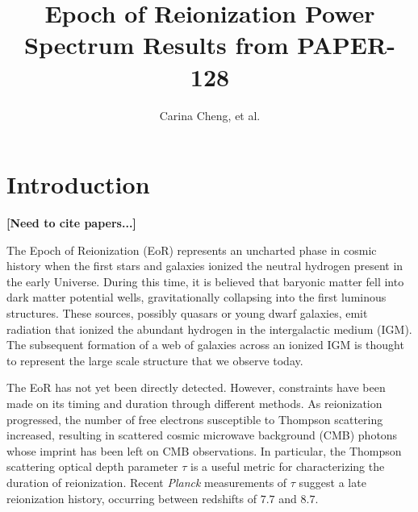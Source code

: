\documentclass[preprint2,numberedappendix,tighten,twocolappendix]{aastex6}  %
\newcommand{\cc}[1]{{\color{purple} \textbf{[#1]}}}
\begin{document}
\title{Epoch of Reionization Power Spectrum Results from PAPER-128}

\author{
Carina Cheng,
et al.
}


	






\begin{abstract}
\end{abstract}


\section{Introduction}
\label{sec:Intro}

\cc{Need to cite papers...}

The Epoch of Reionization (EoR) represents an uncharted phase in cosmic history when the first stars and galaxies ionized the neutral hydrogen present in the early Universe. During this time, it is believed that baryonic matter fell into dark matter potential wells, gravitationally collapsing into the first luminous structures. These sources, possibly quasars or young dwarf galaxies, emit radiation that ionized the abundant hydrogen in the intergalactic medium (IGM). The subsequent formation of a web of galaxies across an ionized IGM is thought to represent the large scale structure that we observe today.

The EoR has not yet been directly detected. However, constraints have been made on its timing and duration through different methods. As reionization progressed, the number of free electrons susceptible to Thompson scattering increased, resulting in scattered cosmic microwave background (CMB) photons whose imprint has been left on CMB observations. In particular, the Thompson scattering optical depth parameter $\tau$ is a useful metric for characterizing the duration of reionization. Recent \textit{Planck} measurements of $\tau$ suggest a late reionization history, occurring between redshifts of $7.7$ and $8.7$.
\end{document}
